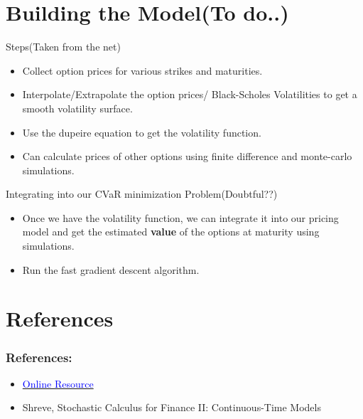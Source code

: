 \documentclass{beamer}
\begin{document}
\section{Building the Model(To do..)}
\begin{frame}{Steps(Taken from the net)}
     \begin{itemize}
        \item Collect option prices for various strikes and maturities.
        \item Interpolate/Extrapolate the option prices/ Black-Scholes Volatilities to get a smooth volatility surface.
        \item Use the dupeire equation to get the volatility function.
        \item Can calculate prices of other options using finite difference and monte-carlo simulations.
     \end{itemize}
\end{frame}
\begin{frame}{Integrating into our CVaR minimization Problem(Doubtful??)}
    \begin{itemize}
        \item Once we have the volatility function, we can integrate it into our pricing model and get the estimated \textbf{value} of the options at maturity using simulations.
        \item Run the fast gradient descent algorithm.
    \end{itemize}
\end{frame}
\section{References}
\begin{frame}
    \frametitle{References:}
    \begin{itemize}
        \item \href{https://www.csie.ntu.edu.tw/~d00922011/python/cases/LocalVol/DUPIRE_FORMULA.PDF}{\textcolor{blue}{Online Resource}}
        \item Shreve, Stochastic Calculus for Finance II: Continuous-Time Models
    \end{itemize}
\end{frame}
\end{document}
